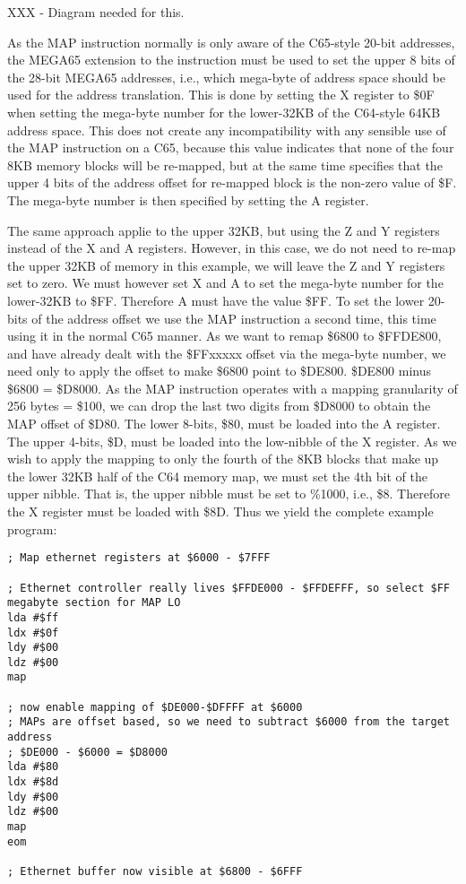 XXX - Diagram needed for this.

As the MAP instruction normally is only aware of the C65-style 20-bit addresses, the MEGA65 extension to the
instruction must be used to set the upper 8 bits of the 28-bit MEGA65 addresses, i.e., which mega-byte of address
space should be used for the address translation.  This is done by setting the X
register to \$0F when setting the mega-byte number for the lower-32KB of the C64-style 64KB address space.
This does not create any incompatibility with any sensible use of the MAP instruction on a C65, because this
value indicates that none of the four 8KB memory blocks will be re-mapped, but at the same time specifies that
the upper 4 bits of the address offset for re-mapped block is the non-zero value of \$F.  The mega-byte number
is then specified by setting the A register.

The same approach applie to the upper 32KB, but using the Z and Y
registers instead of the X and A registers.  However, in this case, we do not need to re-map the upper 32KB of
memory in this example, we will leave the Z and Y registers set to zero.  We must however set X and A to
set the mega-byte number for the lower-32KB to \$FF. Therefore A must have the value \$FF.  To set the lower 20-bits
of the address offset we use the MAP instruction a second time, this time using it in the normal C65 manner.
As we want to remap \$6800 to \$FFDE800, and have already dealt with the \$FFxxxxx offset via the mega-byte number,
we need only to apply the offset to make \$6800 point to \$DE800. \$DE800 minus \$6800 = \$D8000.  As the MAP instruction
operates with a mapping granularity of 256 bytes = \$100, we can drop the last two digits from \$D8000 to obtain the
MAP offset of \$D80. The lower 8-bits, \$80, must be loaded into the A register. The upper 4-bits, \$D, must be loaded into
the low-nibble of the X register.  As we wish to apply the mapping to only the fourth of the 8KB blocks that make up the
lower 32KB half of the C64 memory map, we must set the 4th bit of the upper nibble. That is, the upper nibble must be set
to \%1000, i.e., \$8.  Therefore the X register must be loaded with \$8D.  Thus we yield the complete example program:

\begin{tcolorbox}[colback=black,coltext=white]
\verbatimfont{\codefont}
\begin{verbatim}
; Map ethernet registers at $6000 - $7FFF

; Ethernet controller really lives $FFDE000 - $FFDEFFF, so select $FF megabyte section for MAP LO
lda #$ff
ldx #$0f
ldy #$00
ldz #$00
map

; now enable mapping of $DE000-$DFFFF at $6000
; MAPs are offset based, so we need to subtract $6000 from the target address
; $DE000 - $6000 = $D8000
lda #$80
ldx #$8d
ldy #$00
ldz #$00
map
eom

; Ethernet buffer now visible at $6800 - $6FFF
\end{verbatim}
\end{tcolorbox}

